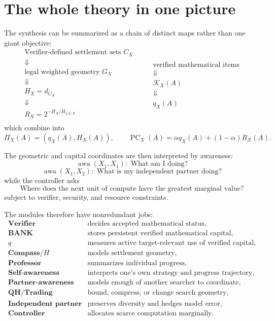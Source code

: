 \documentclass[11pt]{article}
\theoremstyle{definition}
\theoremstyle{remark}
\newcommand{\PC}{\operatorname{PC}}
\newcommand{\awa}{\operatorname{awa}}
\begin{document}
\section{The whole theory in one picture}

The synthesis can be summarized as a chain of distinct maps rather than one giant objective:
\[
\boxed{
\begin{array}{c}
\text{Verifier-defined settlement sets }C_X\\
\Downarrow\\
\text{legal weighted geometry }G_X\\
\Downarrow\\
H_X=d_{C_X}\\
\Downarrow\\
R_X=2^{-H_X/H_{1/2,X}}\\
\end{array}}
\qquad
\boxed{
\begin{array}{c}
\text{verified mathematical items}\\
\Downarrow\\
\mathcal K_X(A)\\
\Downarrow\\
q_X(A)
\end{array}}
\]
which combine into
\[
\boxed{
\Pi_X(A)=(q_X(A),H_X(A)),
\qquad
\PC_X(A)=\alpha q_X(A)+(1-\alpha)R_X(A).
}
\]

The geometric and capital coordinates are then interpreted by awareness:
\[
\boxed{
\awa(X_1,X_1):\text{ What am I doing?}
}
\]
\[
\boxed{
\awa(X_1,X_2):\text{ What is my independent partner doing?}
}
\]
while the controller asks
\[
\boxed{
\text{Where does the next unit of compute have the greatest marginal value?}
}
\]
subject to verifier, security, and resource constraints.

The modules therefore have nonredundant jobs:
\[
\begin{array}{ll}
\textbf{Verifier} & \text{decides accepted mathematical status},\\
\textbf{BANK} & \text{stores persistent verified mathematical capital},\\
\textbf{$q$} & \text{measures active target-relevant use of verified capital},\\
\textbf{Compass/$H$} & \text{models settlement geometry},\\
\textbf{Professor} & \text{summarizes individual progress},\\
\textbf{Self-awareness} & \text{interprets one's own strategy and progress trajectory},\\
\textbf{Partner-awareness} & \text{models enough of another searcher to coordinate},\\
\textbf{QH/Trading} & \text{bound, compress, or change search geometry},\\
\textbf{Independent partner} & \text{preserves diversity and hedges model error},\\
\textbf{Controller} & \text{allocates scarce computation marginally}.
\end{array}
\]
\end{document}
